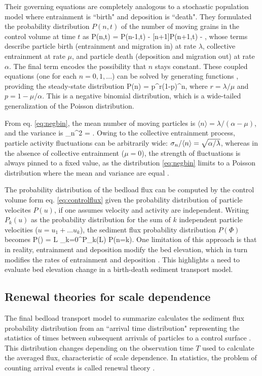 Their governing equations are completely analogous to a stochastic population model \citep{Cox1965, Pielou1977} where entrainment is ``birth" and deposition is ``death".
They formulated the probability distribution $P(n,t)$ of the number of moving grains in the control volume at time $t$ as
\be \pt P(n,t) =  P(n-1,t) - [n+1]\alpha P(n+1,t) - ,\ee
whose terms describe particle birth (entrainment and migration in) at rate $\lambda$, collective entrainment at rate $\mu$, and particle death (deposition and migration out) at rate $\alpha$.
The final term encodes the possibility that $n$ stays constant.
These coupled equations (one for each $n=0,1,\dots$) can be solved by generating functions \citep{Cox1965}, providing the steady-state distribution
\be P(n) = p^r(1-p)^n, \label{eq:negbin}\ee
where $r = \lambda/\mu$ and $p = 1-\mu/\alpha$.
This is a negative binomial distribution, which is a wide-tailed generalization of the Poisson distribution.

From eq. \ref{eq:negbin}, the mean number of moving particles is $\langle n \rangle = \lambda/(\alpha-\mu)$, and the variance is
\be \sigma_n^2 = . \ee
Owing to the collective entrainment process, particle activity fluctuations can be arbitrarily wide: $\sigma_n/\langle n \rangle = \sqrt{\alpha/\lambda}$, whereas in the absence of collective entrainment ($\mu=0$), the strength of fluctuations is always pinned to a fixed value, as the distribution \ref{eq:negbin} limits to a Poisson distribution where the mean and variance are equal \citep{Ancey2006}.

The probability distribution of the bedload flux can be computed by the control volume form eq. \ref{eq:controlflux} given the probability distribution of particle velocites $P(u)$, if one assumes velocity and activity are independent. Writing $P_k(u)$ as the probability distribution for the sum of $k$ independent particle velocities ($u=u_1+\dots u_k$), the sediment flux probability distribution $P(\Phi)$ becomes \citep[e.g.][]{Ancey2014}
\be P(\Phi) = L \sum_{k=0}^\infty P_k(L\Phi) P(n=k). \ee
One limitation of this approach is that in reality, entrainment and deposition modify the bed elevation, which in turn modifies the rates of entrainment and deposition \citep{Sawai1987,Wong2007}. 
This highlights a need to evaluate bed elevation change in a birth-death sediment transport model.

\subsection{Renewal theories for scale dependence}
\label{sec:renewal}
The final bedload transport model to summarize calculates the sediment flux probability distribution from an ``arrival time distribution" representing the statistics of times between subsequent arrivals of particles to a control surface \citep{Turowski2010, Heyman2013,Ancey2020}. This distribution changes depending on the observation time $T$ used to calculate the averaged flux, characteristic of scale dependence. In statistics, the problem of counting arrival events is called renewal theory \citep{Cox1962}.

